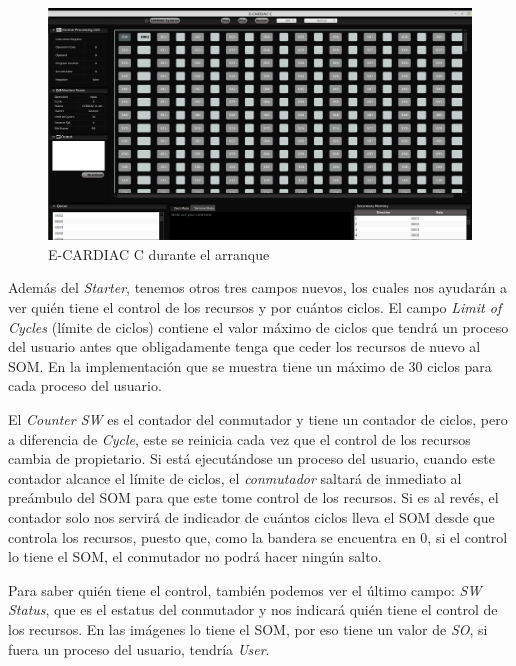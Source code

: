 \documentclass[letterpaper,12pt,oneside]{book}
\begin{document}
		\begin{figure}[h]		
			\centering
			\includegraphics[scale=0.32]{media/CARDIACC/ECARDIACC_encendida1.png}
			\caption{E-CARDIAC C durante el arranque}
			\label{fig:eccEncendida1}
		\end{figure}
	
		Además del \textit{Starter}, tenemos otros tres campos nuevos, los cuales nos ayudarán a ver quién tiene el control de los recursos y por 
		cuántos ciclos. El campo
		\textit{Limit of Cycles} (límite de ciclos) contiene el valor máximo de ciclos que tendrá un proceso del usuario antes que obligadamente tenga 
		que ceder
		los recursos de nuevo al SOM. En la implementación que se muestra tiene un máximo de 30 ciclos para cada proceso del usuario.
  
        El \textit{Counter SW} es el contador del conmutador y tiene
		un contador de ciclos, pero a diferencia de \textit{Cycle}, este se reinicia cada vez que el control de los recursos cambia de propietario. Si 
		está
		ejecutándose un proceso del usuario, cuando este contador alcance el límite de ciclos, el \textit{conmutador} saltará
		de inmediato al preámbulo del SOM para que este tome control de los recursos. Si es al revés, el contador solo nos servirá de indicador
		de cuántos ciclos lleva el SOM desde que controla los recursos, puesto que, como la bandera se encuentra en 0, si el control lo tiene el SOM, 
		el conmutador no podrá hacer ningún salto.
  
        Para saber quién tiene el control, también podemos ver el último campo: \textit{SW Status}, que es el estatus del conmutador y nos indicará 
        quién tiene
		el control de los recursos. En las imágenes lo tiene el SOM, por eso tiene un valor de \textit{SO}, si fuera un proceso del usuario, tendría \textit{User}. 
\end{document}
